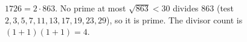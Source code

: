 $1726=2\cdot863$. No prime at most $\sqrt{863}<30$ divides $863$ (test $2,3,5,7,11,13,17,19,23,29$), so it is prime. The divisor count is $(1+1)(1+1)=\boxed4$.
